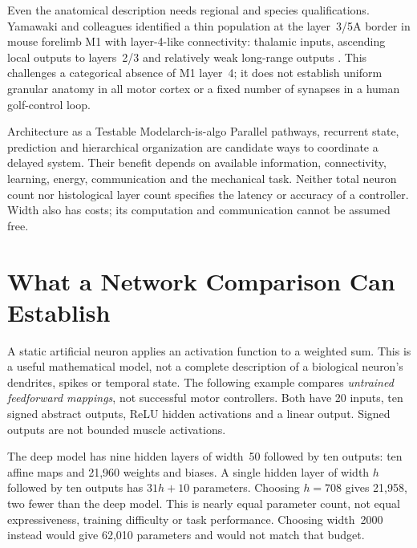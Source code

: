 Even the anatomical description needs regional and species qualifications.
Yamawaki and colleagues identified a thin population at the layer~3/5A border in
mouse forelimb M1 with layer-4-like connectivity: thalamic inputs, ascending
local outputs to layers~2/3 and relatively weak long-range outputs
\cite{yamawaki2014review}. This challenges a categorical absence of M1 layer~4;
it does not establish uniform granular anatomy in all motor cortex or a fixed
number of synapses in a human golf-control loop.

\begin{insight}{Architecture as a Testable Model}{arch-is-algo}
Parallel pathways, recurrent state, prediction and hierarchical organization
are candidate ways to coordinate a delayed system. Their benefit depends on
available information, connectivity, learning, energy, communication and the
mechanical task. Neither total neuron count nor histological layer count
specifies the latency or accuracy of a controller. Width also has costs;
its computation and communication cannot be assumed free.
\end{insight}

\section{What a Network Comparison Can Establish}

A static artificial neuron applies an activation function to a weighted sum.
This is a useful mathematical model, not a complete description of a biological
neuron's dendrites, spikes or temporal state. The following example compares
\emph{untrained feedforward mappings}, not successful motor controllers. Both
have 20 inputs, ten signed abstract outputs, ReLU hidden activations and a
linear output. Signed outputs are not bounded muscle activations.

The deep model has nine hidden layers of width~50 followed by ten outputs:
ten affine maps and 21,960 weights and biases. A single hidden layer of width
$h$ followed by ten outputs has $31h+10$ parameters. Choosing $h=708$ gives
21,958, two fewer than the deep model. This is nearly equal parameter count,
not equal expressiveness, training difficulty or task performance. Choosing
width~2000 instead would give 62,010 parameters and would not match that budget.

